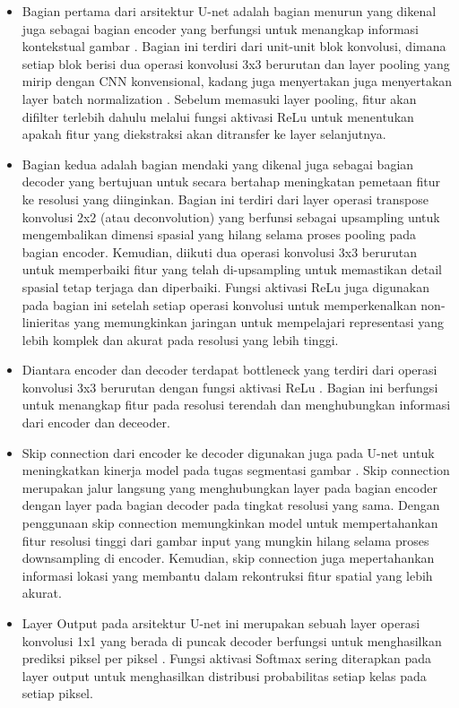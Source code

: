 \begin{itemize}
	\item Bagian pertama dari arsitektur U-net adalah bagian menurun yang dikenal juga sebagai bagian encoder yang berfungsi untuk menangkap informasi kontekstual gambar \cite{azad_medical_2022}. Bagian ini terdiri dari unit-unit blok konvolusi, dimana setiap blok berisi dua operasi konvolusi 3x3 berurutan dan layer pooling yang mirip dengan CNN konvensional, kadang juga menyertakan juga menyertakan layer batch normalization \cite{younisse_fine-tuning_2023}. Sebelum memasuki layer pooling, fitur akan difilter terlebih dahulu melalui fungsi aktivasi ReLu untuk menentukan apakah fitur yang diekstraksi akan ditransfer ke layer selanjutnya.
	
	\item Bagian kedua adalah bagian mendaki yang dikenal juga sebagai bagian decoder yang bertujuan untuk secara bertahap meningkatan pemetaan fitur ke resolusi yang diinginkan\cite{siddique_u-net_2020}. Bagian ini terdiri dari layer operasi transpose konvolusi 2x2 (atau deconvolution) yang berfunsi sebagai upsampling untuk mengembalikan dimensi spasial yang hilang selama proses pooling pada bagian encoder. Kemudian, diikuti dua operasi konvolusi 3x3 berurutan untuk memperbaiki fitur yang telah di-upsampling untuk memastikan detail spasial tetap terjaga dan diperbaiki\cite{purushothaman_image_2022}. Fungsi aktivasi ReLu juga digunakan pada bagian ini setelah setiap operasi konvolusi untuk memperkenalkan non-linieritas yang memungkinkan jaringan untuk mempelajari representasi yang lebih komplek dan akurat pada resolusi yang lebih tinggi\cite{huang_fully_2022}.
	
	\item Diantara encoder dan decoder terdapat bottleneck yang terdiri dari operasi konvolusi 3x3 berurutan dengan fungsi aktivasi ReLu \cite{azad_medical_2022}. Bagian ini berfungsi untuk menangkap fitur pada resolusi terendah dan menghubungkan informasi dari encoder dan deceoder.
	
	\item Skip connection dari encoder ke decoder digunakan juga pada U-net untuk meningkatkan kinerja model pada tugas segmentasi gambar \cite{azad_medical_2022}. Skip connection  merupakan jalur langsung yang menghubungkan layer pada bagian encoder dengan layer pada bagian decoder pada tingkat resolusi yang sama. Dengan penggunaan skip connection memungkinkan model untuk mempertahankan fitur resolusi tinggi dari gambar input yang mungkin hilang selama proses downsampling di encoder. Kemudian, skip connection juga mepertahankan informasi lokasi yang membantu dalam rekontruksi fitur spatial yang lebih akurat\cite{siddique_u-net_2020}.
	
	\item Layer Output  pada arsitektur U-net ini merupakan sebuah layer operasi konvolusi 1x1 yang berada di puncak decoder berfungsi untuk menghasilkan prediksi piksel per piksel \cite{huang_fully_2022,azad_medical_2022}. Fungsi aktivasi Softmax sering diterapkan pada layer output untuk menghasilkan distribusi probabilitas setiap kelas pada setiap piksel. 
	
	
\end{itemize}




